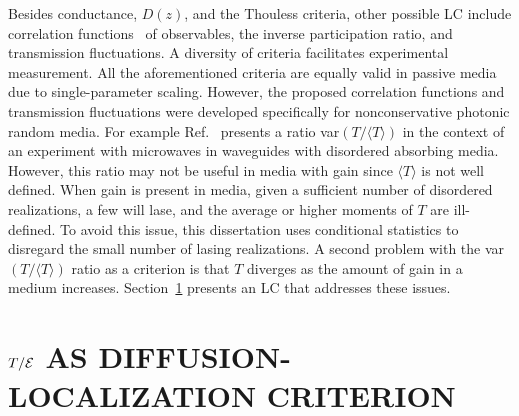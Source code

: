 Besides conductance, $D(z)$, and the Thouless criteria, other possible LC include correlation functions~\cite{2005_Yamilov_correlations} of observables, the inverse participation ratio, and transmission fluctuations. A diversity of criteria facilitates experimental measurement. All the aforementioned criteria are equally valid in passive media due to single-parameter scaling. However, the proposed correlation functions and transmission fluctuations were developed specifically for nonconservative photonic random media. For example Ref.~\cite{2000_chabanov_nature} presents a ratio var$(T/\langle T \rangle)$ in the context of an experiment with microwaves in waveguides with disordered absorbing media. However, this ratio may not be useful in media with gain since $\langle T \rangle$ is not well defined. When gain is present in media, given a sufficient number of disordered realizations, a few will lase, and the average or higher moments of $T$ are ill-defined. To avoid this issue, this dissertation uses conditional statistics to disregard the small number of lasing realizations. A second problem with the var$(T/\langle T \rangle)$ ratio as a criterion is that $T$ diverges as the amount of gain in a medium increases. Section~\ref{sec:te_ratio_candidate} presents an LC that addresses these issues.

\section{\texorpdfstring{$T/{\cal E}$}{T/E} AS DIFFUSION-LOCALIZATION CRITERION}
\label{sec:te_ratio_candidate}

